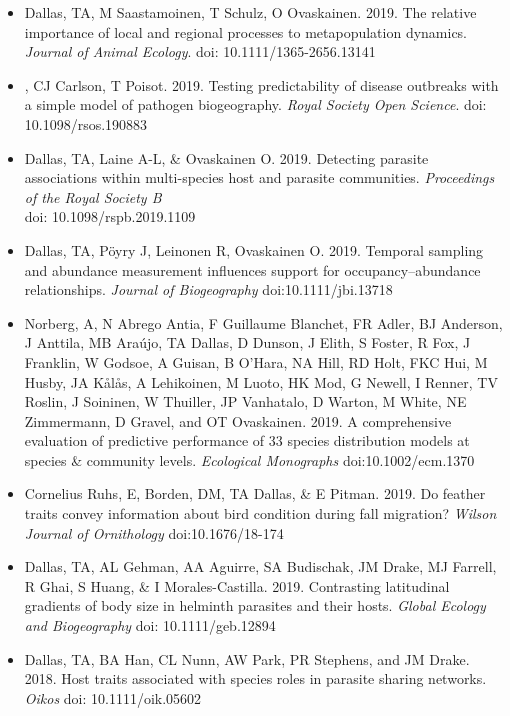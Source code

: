 \documentclass[]{CV}
\begin{document}
{}

\begin{itemize}

	\item {\mefont Dallas, TA},  M Saastamoinen, T Schulz, O Ovaskainen. 2019. The relative importance of local and regional processes to metapopulation dynamics. \textit{Journal of Animal Ecology}. doi: 10.1111/1365-2656.13141 

	\item {}, CJ Carlson, T Poisot. 2019. Testing predictability of disease outbreaks with a simple model of pathogen biogeography. \textit{Royal Society Open Science}. doi: 10.1098/rsos.190883

	\item {\mefont Dallas, TA}, Laine A-L, \& Ovaskainen O. 2019. Detecting parasite associations within multi-species host and parasite communities. \textit{Proceedings of the Royal Society B} \\ doi: 10.1098/rspb.2019.1109

	\item {\mefont Dallas, TA}, P{\"o}yry J, Leinonen R, Ovaskainen O. 2019. Temporal sampling and abundance measurement influences support for occupancy–abundance relationships. \textit{Journal of Biogeography} doi:10.1111/jbi.13718​

  \item Norberg, A, N Abrego Antia, F Guillaume Blanchet, FR Adler, BJ Anderson, J Anttila, MB Araújo, {\mefont TA Dallas}, D Dunson, J Elith, S Foster, R Fox, J Franklin, W Godsoe, A Guisan, B O'Hara, NA Hill, RD Holt, FKC Hui, M Husby, JA Kålås, A Lehikoinen, M Luoto, HK Mod, G Newell, I Renner, TV Roslin, J Soininen, W Thuiller, JP Vanhatalo, D Warton, M White, NE Zimmermann, D Gravel, and OT Ovaskainen. 2019. A comprehensive evaluation of predictive performance of 33 species distribution models at species \& community levels. \textit{Ecological Monographs} doi:10.1002/ecm.1370
    
  \item Cornelius Ruhs, E, Borden, DM, {\mefont TA Dallas}, \& E Pitman. 2019. Do feather traits convey information about bird condition during fall migration? \textit{Wilson Journal of Ornithology} doi:10.1676/18-174

  \item {\mefont Dallas, TA}, AL Gehman, AA Aguirre, SA Budischak, JM Drake, MJ Farrell, R Ghai, S Huang, \& I Morales-Castilla. 2019. Contrasting latitudinal gradients of body size in helminth parasites and their hosts. \textit{Global Ecology and Biogeography} doi: 10.1111/geb.12894

\item {\mefont Dallas, TA}, BA Han, CL Nunn, AW Park, PR Stephens, and JM Drake. 2018. Host traits associated with species roles in parasite sharing networks. \textit{Oikos} doi: 10.1111/oik.05602
 
\end{itemize}
\end{document}
